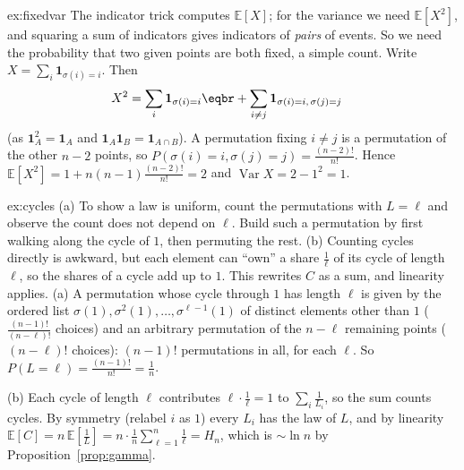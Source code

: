 \begin{solution}{ex:fixedvar}
\idea The indicator trick computes $\mathbb E[X]$; for the variance we need $\mathbb E[X^2]$, and squaring a sum of indicators gives indicators of \emph{pairs} of events. So we need the probability that two given points are both fixed, a simple count.
\writeup Write $X=\sum_i\mathbf 1_{\sigma(i)=i}$. Then
\[
\begin{aligned}X^2&=\sum_i\mathbf 1_{\sigma(i)=i}\eqbr+\sum_{i\ne j}\mathbf 1_{\sigma(i)=i,\,\sigma(j)=j}\end{aligned}
\]
(as $\mathbf 1_A^2=\mathbf 1_A$ and $\mathbf 1_A\mathbf 1_B=\mathbf 1_{A\cap B}$). A permutation fixing $i\ne j$ is a permutation of the other $n-2$ points,
so $P(\sigma(i)=i,\sigma(j)=j)=\frac{(n-2)!}{n!}$. Hence $\mathbb E[X^2]=1+n(n-1)\frac{(n-2)!}{n!}=2$ and $\operatorname{Var}X=2-1^2=1$.
\end{solution}

\begin{solution}{ex:cycles}
\idea (a) To show a law is uniform, count the permutations with $L=\ell$ and observe the count does not depend on $\ell$. Build such a permutation by first walking along the cycle of $1$, then permuting the rest. (b) Counting cycles directly is awkward, but each element can ``own'' a share $\frac1\ell$ of its cycle of length $\ell$, so the shares of a cycle add up to $1$. This rewrites $C$ as a sum, and linearity applies.
\writeup (a) A permutation whose cycle through $1$ has length $\ell$ is given by the ordered list $\sigma(1),\sigma^2(1),\dots,\sigma^{\ell-1}(1)$ of distinct elements other than $1$
($\frac{(n-1)!}{(n-\ell)!}$ choices) and an arbitrary permutation of the $n-\ell$ remaining points ($(n-\ell)!$ choices): $(n-1)!$ permutations in all, for each $\ell$. So $P(L=\ell)=\frac{(n-1)!}{n!}=\frac1n$.

(b) Each cycle of length $\ell$ contributes $\ell\cdot\frac1\ell=1$ to $\sum_i\frac1{L_i}$, so the sum counts cycles. By symmetry (relabel $i$ as $1$) every $L_i$ has the law of $L$, and by linearity
$\mathbb E[C]=n\,\mathbb E\left[\frac1L\right]=n\cdot\frac1n\sum_{\ell=1}^n\frac1\ell=H_n$, which is $\sim\ln n$ by Proposition~\ref{prop:gamma}.
\end{solution}

